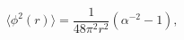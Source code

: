 \begin{equation}
\langle\phi ^{2}(r)\rangle=
\frac{1}{48\pi^{2}r^{2}}
\left(\alpha^{-2}-1\right),
\label{dphi2}
\end{equation}

